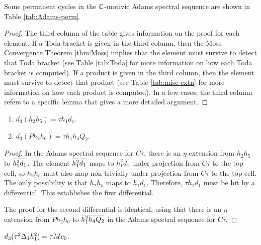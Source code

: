 \begin{prop}
\label{prop:Adams-perm}
Some permanent cycles in the
$\mathbb{C}$-motivic Adams spectral sequence are shown in 
Table \ref{tab:Adams-perm}.
\end{prop}

\begin{proof}
The third column of the table gives information on the proof
for each element.  If a Toda bracket is given in the third
column, then
the Moss Convergence Theorem \ref{thm:Moss} implies that the
element must survive to detect that Toda bracket
(see Table \ref{tab:Toda} for more information on how each
Toda bracket is computed).
If a product is given in the third column, then
the element must survive to detect that product
(see Table \ref{tab:misc-extn} for more information
on how each product is computed).
In a few cases, the third column refers to a specific lemma
that gives a more detailed argument.
\end{proof}

\begin{lemma}
\label{lem:d3-h2h5}
\mbox{}
\begin{enumerate}
\item
{}
$d_3(h_2 h_5) = \tau h_1 d_1$.
\item
{}
$d_3(P h_2 h_6) = \tau h_1 h_4 Q_2$.
\end{enumerate}
\end{lemma}

\begin{proof}
In the Adams spectral sequence for $C\tau$, there is an
$\eta$ extension from $h_2 h_5$ to $\overline{h_1^2 d_1}$.
The element $\overline{h_1^2 d_1}$ maps to $h_1^2 d_1$ under projection
from $C\tau$ to the top cell, so
$h_2 h_5$ must also map non-trivially under projection from
$C\tau$ to the top cell.
The only possibility is that $h_2 h_5$ maps to $h_1 d_1$.
Therefore, $\tau h_1 d_1$ must be hit by a differential.
This establishes the first differential.

The proof for the second differential is identical, using that
there is an $\eta$ extension from $P h_2 h_6$ to $\overline{h_1^2 h_4 Q_2}$
in the Adams spectral sequence for $C\tau$.
\end{proof}

\begin{lemma}
\label{lem:d3-t^2D1h1^2}
$d_3(\tau^2 \Delta_1 h_1^2) = \tau M c_0$.
\end{lemma}

